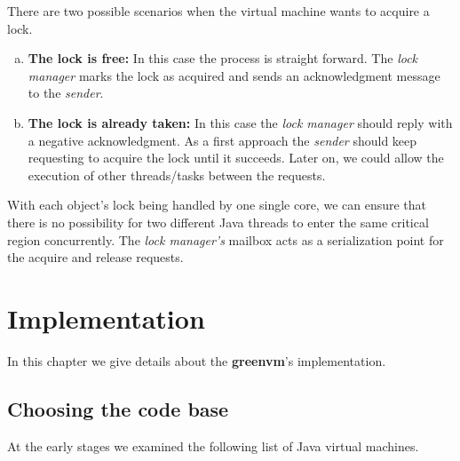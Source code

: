 \documentclass[
a4paper,
12pt,
]{report}
\newcommand{\gvm}{{\fontfamily{fco}\selectfont\textbf{\color{g}green\color{v}vm}}\xspace}
\newcommand{\java}{Java\texttrademark\xspace}
\begin{document}
There are two possible scenarios when the virtual machine wants to
acquire a lock.
\begin{enumerate}[a)]
\item \textbf{The lock is free:} In this case the process is straight
  forward.  The \emph{lock manager} marks the lock as acquired and
  sends an acknowledgment message to the \emph{sender}.
\item \textbf{The lock is already taken:} In this case the \emph{lock
    manager} should reply with a negative acknowledgment. As a first
  approach the \emph{sender} should keep requesting to acquire the
  lock until it succeeds. Later on, we could allow the execution of
  other threads/tasks between the requests.
\end{enumerate}

With each object's lock being handled by one single core, we can
ensure that there is no possibility for two different \java threads to
enter the same critical region concurrently. The \emph{lock manager's}
mailbox acts as a serialization point for the acquire and release
requests.

\chapter{Implementation}
\label{cha:implementation}

In this chapter we give details about the \gvm's implementation.

\section{Choosing the code base}

At the early stages we examined the following list of \java virtual
machines.
\end{document}
